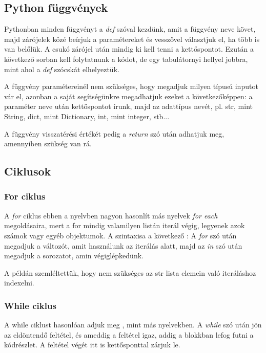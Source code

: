 \documentclass{article}
\theoremstyle{definition}
\theoremstyle{theorem}
\begin{document}
\subsection{Python függvények}
Pythonban minden függvényt a \textit{def} szóval kezdünk, amit a függvény neve követ, majd zárójelek közé beírjuk a paramétereket és vesszővel választjuk el, ha több is van belőlük. A csukó zárójel után mindig ki kell tenni a kettőspontot. Ezután a következő sorban kell folytatnunk a kódot, de egy tabulátornyi hellyel jobbra, mint ahol a \textit{def} szócskát elhelyeztük.

A függvény paramétereinél nem szükséges, hogy megadjuk milyen típusú inputot vár el, azonban a saját segítségünkre megadhatjuk ezeket a következőképpen: a paraméter neve után kettőspontot írunk, majd az adattípus nevét, pl. str, mint String, dict, mint Dictionary, int, mint integer, stb...


A függvény visszatérési értékét pedig a \textit{return} szó után adhatjuk meg, amennyiben szükség van rá.
\subsection{Ciklusok}
\subsubsection{For ciklus}
A \textit{for} ciklus ebben a nyelvben nagyon hasonlít más nyelvek \textit{for each} megoldásaira, mert a for mindig valamilyen listán iterál végig, legyenek azok számok vagy egyéb objektumok. A szintaxisa a következő :
A \textit{for} szó után megadjuk a változót, amit használunk az iterálás alatt, majd az \textit{in} szó után megadjuk a sorozatot, amin végiglépkedünk.



A példán szemléltettük, hogy nem szükséges az str lista elemein való iteráláshoz indexelni.
\subsubsection{While ciklus}
A while ciklust hasonlóan adjuk meg , mint más nyelvekben. A \textit{while} szó után jön az eldöntendő feltétel, és ameddig a feltétel igaz, addig a blokkban lefog futni a kódrészlet. A feltétel végét itt is kettősponttal zárjuk le.

\end{document}
